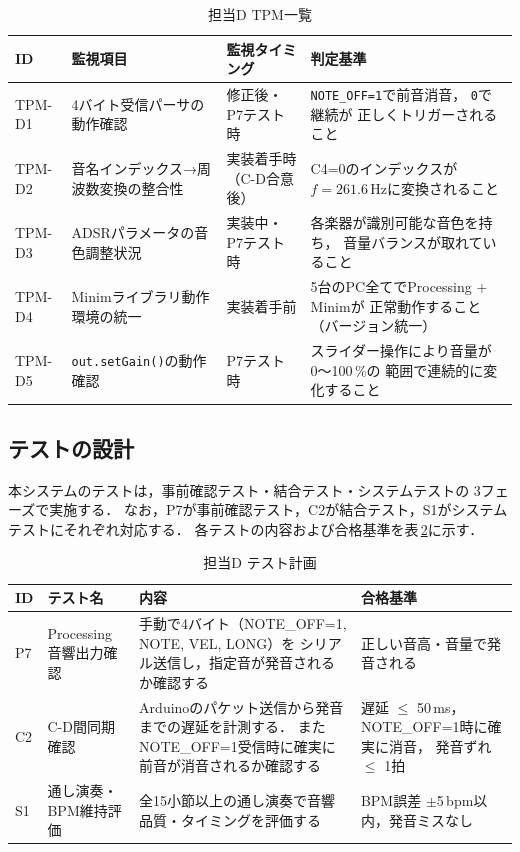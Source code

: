 \begin{table}[H]
  \centering
  \caption{担当D TPM一覧}
  \label{tab:tpm_d}
  \begin{tabular}{lp{4cm}p{3cm}p{4.5cm}}
    \hline
    ID & 監視項目 & 監視タイミング & 判定基準 \\
    \hline
    TPM-D1 & 4バイト受信パーサの動作確認
           & 修正後・P7テスト時
           & \texttt{NOTE\_OFF=1}で前音消音，
             \texttt{0}で継続が
             正しくトリガーされること \\
    TPM-D2 & 音名インデックス→周波数変換の整合性
           & 実装着手時（C-D合意後）
           & C4=0のインデックスが
             $f=261.6$\,Hzに変換されること \\
    TPM-D3 & ADSRパラメータの音色調整状況
           & 実装中・P7テスト時
           & 各楽器が識別可能な音色を持ち，
             音量バランスが取れていること \\
    TPM-D4 & Minimライブラリ動作環境の統一
           & 実装着手前
           & 5台のPC全てでProcessing + Minimが
             正常動作すること（バージョン統一） \\
    TPM-D5 & \texttt{out.setGain()}の動作確認
           & P7テスト時
           & スライダー操作により音量が0〜100\,\%の
             範囲で連続的に変化すること \\
    \hline
  \end{tabular}
\end{table}

\subsection{テストの設計}

本システムのテストは，事前確認テスト・結合テスト・システムテストの
3フェーズで実施する．
なお，P7が事前確認テスト，C2が結合テスト，S1がシステムテストにそれぞれ対応する．
各テストの内容および合格基準を表\,\ref{tab:test_d}に示す．

\begin{table}[H]
  \centering
  \caption{担当D テスト計画}
  \label{tab:test_d}
  \begin{tabular}{llp{5cm}p{4cm}}
    \hline
    ID & テスト名 & 内容 & 合格基準 \\
    \hline
    P7 & Processing音響出力確認
       & 手動で4バイト（NOTE\_OFF=1, NOTE, VEL, LONG）を
         シリアル送信し，指定音が発音されるか確認する
       & 正しい音高・音量で発音される \\
    C2 & C-D間同期確認
       & Arduinoのパケット送信から発音までの遅延を計測する．
         またNOTE\_OFF=1受信時に確実に前音が消音されるか確認する
       & 遅延 $\leq$ 50\,ms，NOTE\_OFF=1時に確実に消音，
         発音ずれ $\leq$ 1拍 \\
    S1 & 通し演奏・BPM維持評価
       & 全15小節以上の通し演奏で音響品質・タイミングを評価する
       & BPM誤差 $\pm$5\,bpm以内，発音ミスなし \\
    \hline
  \end{tabular}
\end{table}


